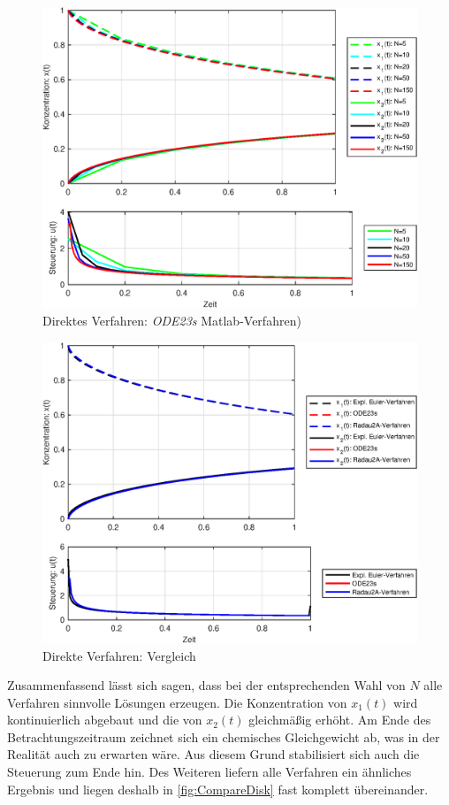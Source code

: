 \begin{figure}[h!]
	\centering
	\includegraphics[width=.98\textwidth]{images/ODE23s_Result}
	\caption{Direktes Verfahren: \textit{ODE23s} Matlab-Verfahren)}
	\label{fig:ODE23s}
\end{figure}

\begin{figure}[h!]
	\centering
	\includegraphics[width=.98\textwidth]{images/CompareDirect_Method}
	\caption{Direkte Verfahren: Vergleich}
	\label{fig:CompareDisk}
\end{figure}

Zusammenfassend lässt sich sagen, dass bei der entsprechenden Wahl von $N$ alle Verfahren sinnvolle Lösungen erzeugen. Die Konzentration von $x_1(t)$ wird kontinuierlich abgebaut und die von $x_2(t)$ gleichmäßig erhöht. Am Ende des Betrachtungszeitraum zeichnet sich ein chemisches Gleichgewicht ab, was in der Realität auch zu erwarten wäre.  Aus diesem Grund stabilisiert sich auch die Steuerung zum Ende hin. Des Weiteren liefern alle Verfahren ein ähnliches Ergebnis und liegen deshalb in \autoref{fig:CompareDisk} fast komplett übereinander.

